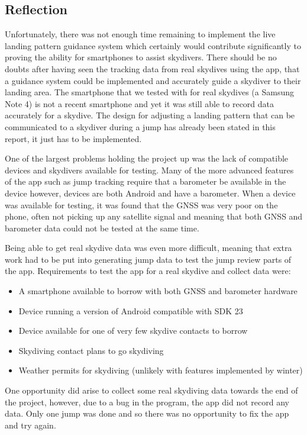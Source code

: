 \subsection{Reflection}
Unfortunately, there was not enough time remaining to implement the live landing pattern guidance system which certainly would contribute significantly to proving the ability for smartphones to assist skydivers. There should be no doubts after having seen the tracking data from real skydives using the app, that a guidance system could be implemented and accurately guide a skydiver to their landing area. The smartphone that we tested with for real skydives (a Samsung Note 4) is not a recent smartphone and yet it was still able to record data accurately for a skydive. The design for adjusting a landing pattern that can be communicated to a skydiver during a jump has already been stated in this report, it just has to be implemented.

One of the largest problems holding the project up was the lack of compatible devices and skydivers available for testing. Many of the more advanced features of the app such as jump tracking require that a barometer be available in the device however, devices are both Android and have a barometer. When a device was available for testing, it was found that the GNSS was very poor on the phone, often not picking up any satellite signal and meaning that both GNSS and barometer data could not be tested at the same time.

Being able to get real skydive data was even more difficult, meaning that extra work had to be put into generating jump data to test the jump review parts of the app. Requirements to test the app for a real skydive and collect data were:
\begin{itemize}
  \item A smartphone available to borrow with both GNSS and barometer hardware
  \item Device running a version of Android compatible with SDK 23
  \item Device available for one of very few skydive contacts to borrow
  \item Skydiving contact plans to go skydiving
  \item Weather permits for skydiving (unlikely with features implemented by winter)
\end{itemize}
One opportunity did arise to collect some real skydiving data towards the end of the project, however, due to a bug in the program, the app did not record any data. Only one jump was done and so there was no opportunity to fix the app and try again.

